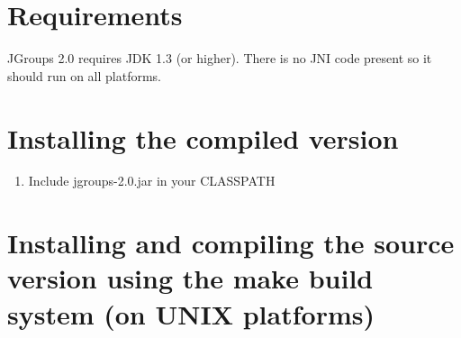  
  \section{Requirements}

  JGroups 2.0 requires JDK 1.3 (or higher). There is no JNI code present so it
  should run on all platforms.


  \section{Installing the compiled version}

  \begin{enumerate}
  \item Include jgroups-2.0.jar in your CLASSPATH 
  \end{enumerate}



  \section{Installing and compiling the source version using the make build system (on UNIX platforms)}

